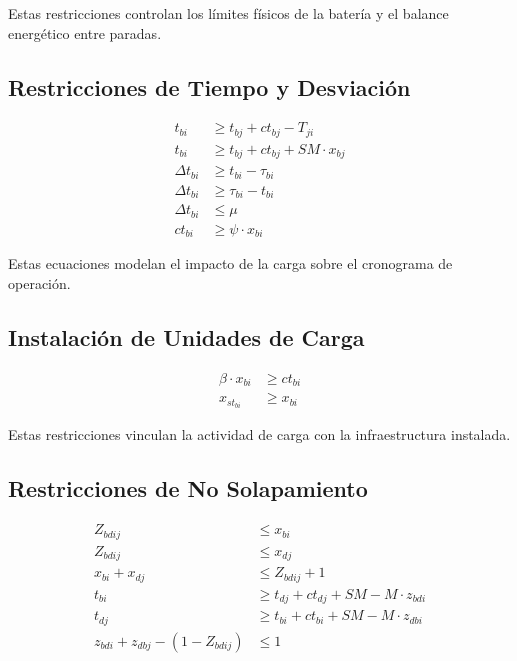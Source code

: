 \documentclass[12pt]{article}
\begin{document}
Estas restricciones controlan los límites físicos de la batería y el balance energético entre paradas.

\subsection{Restricciones de Tiempo y Desviación}

\begin{align}
t_{bi} &\geq t_{bj} + ct_{bj} - T_{ji} \tag{5} \\
t_{bi} &\geq t_{bj} + ct_{bj} + SM \cdot x_{bj} \tag{6} \\
\Delta t_{bi} &\geq t_{bi} - \tau_{bi} \tag{7} \\
\Delta t_{bi} &\geq \tau_{bi} - t_{bi} \tag{8} \\
\Delta t_{bi} &\leq \mu \tag{9} \\
ct_{bi} &\geq \psi \cdot x_{bi} \tag{10}
\end{align}

Estas ecuaciones modelan el impacto de la carga sobre el cronograma de operación.

\subsection{Instalación de Unidades de Carga}

\begin{align}
\beta \cdot x_{bi} &\geq ct_{bi} \tag{11} \\
x_{st_{bi}} &\geq x_{bi} \tag{12}
\end{align}

Estas restricciones vinculan la actividad de carga con la infraestructura instalada.

\subsection{Restricciones de No Solapamiento}

\begin{align}
Z_{bdij} &\leq x_{bi} \tag{13} \\
Z_{bdij} &\leq x_{dj} \tag{14} \\
x_{bi} + x_{dj} &\leq Z_{bdij} + 1 \tag{15} \\
t_{bi} &\geq t_{dj} + ct_{dj} + SM - M \cdot z_{bdi} \tag{16} \\
t_{dj} &\geq t_{bi} + ct_{bi} + SM - M \cdot z_{dbi} \tag{17} \\
z_{bdi} + z_{dbj} - (1 - Z_{bdij}) &\leq 1 \tag{18}
\end{align}
\end{document}
